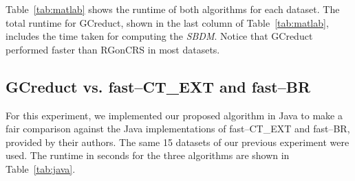 \documentclass[authoryear,11pt]{elsarticle}
\begin{document}
  Table~\ref{tab:matlab} shows the runtime of both algorithms for each dataset. The total runtime for GCreduct, shown in the last column of Table~\ref{tab:matlab}, includes the time taken for computing the \textit{SBDM}. Notice that GCreduct performed faster than RGonCRS in most datasets.

\subsection{GCreduct vs. fast--CT\_EXT and fast--BR}\label{sub:java}

  For this experiment, we implemented our proposed algorithm in Java to make a fair comparison against the Java implementations of fast--CT\_EXT and fast--BR, provided by their authors. The same 15 datasets of our previous experiment were used. The runtime in seconds for the three algorithms are shown in Table~\ref{tab:java}. 
\end{document}
